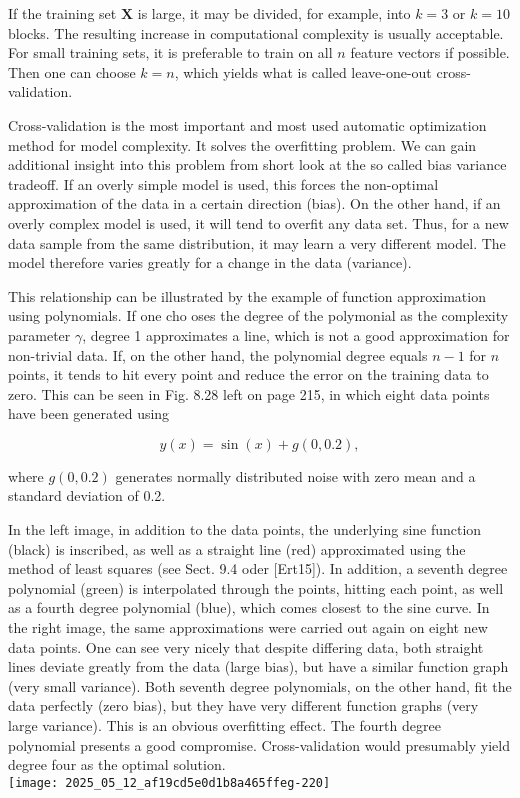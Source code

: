 \documentclass[10pt]{article}
\begin{document}
If the training set $\boldsymbol{X}$ is large, it may be divided, for example, into $k=3$ or $k=10$ blocks. The resulting increase in computational complexity is usually acceptable. For small training sets, it is preferable to train on all $n$ feature vectors if possible. Then one can choose $k=n$, which yields what is called leave-one-out cross-validation.

Cross-validation is the most important and most used automatic optimization method for model complexity. It solves the overfitting problem. We can gain additional insight into this problem from short look at the so called bias variance tradeoff. If an overly simple model is used, this forces the non-optimal approximation of the data in a certain direction (bias). On the other hand, if an overly complex model is used, it will tend to overfit any data set. Thus, for a new data sample from the same distribution, it may learn a very different model. The model therefore varies greatly for a change in the data (variance).

This relationship can be illustrated by the example of function approximation using polynomials. If one cho
oses the degree of the polymonial as the complexity parameter $\gamma$, degree 1 approximates a line, which is not a good approximation for non-trivial data. If, on the other hand, the polynomial degree equals $n-1$ for $n$ points, it tends to hit every point and reduce the error on the training data to zero. This can be seen in Fig. 8.28 left on page 215, in which eight data points have been generated using

$$
y(x)=\sin (x)+g(0,0.2),
$$

where $g(0,0.2)$ generates normally distributed noise with zero mean and a standard deviation of 0.2.

In the left image, in addition to the data points, the underlying sine function (black) is inscribed, as well as a straight line (red) approximated using the method of least squares (see Sect. 9.4 oder [Ert15]). In addition, a seventh degree polynomial (green) is interpolated through the points, hitting each point, as well as a fourth degree polynomial (blue), which comes closest to the sine curve. In the right image, the same approximations were carried out again on eight new data points. One can see very nicely that despite differing data, both straight lines deviate greatly from the data (large bias), but have a similar function graph (very small variance). Both seventh degree polynomials, on the other hand, fit the data perfectly (zero bias), but they have very different function graphs (very large variance). This is an obvious overfitting effect. The fourth degree polynomial presents a good compromise. Cross-validation would presumably yield degree four as the optimal solution.\\
\texttt{[image: 2025\_05\_12\_af19cd5e0d1b8a465ffeg-220]}
\end{document}
